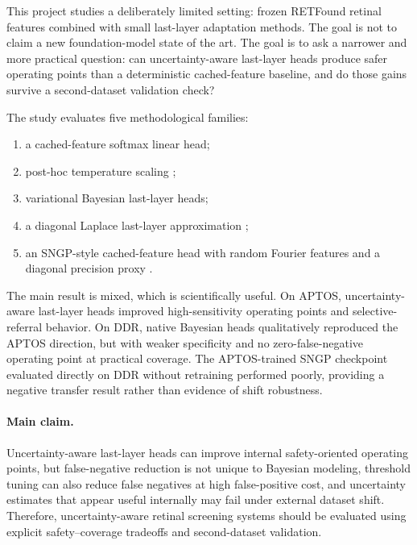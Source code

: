 \documentclass[11pt]{article}
\begin{document}
This project studies a deliberately limited setting: frozen RETFound retinal features \citep{zhou2023retfound} combined with small last-layer adaptation methods. The goal is not to claim a new foundation-model state of the art. The goal is to ask a narrower and more practical question: can uncertainty-aware last-layer heads produce safer operating points than a deterministic cached-feature baseline, and do those gains survive a second-dataset validation check?

The study evaluates five methodological families:
\begin{enumerate}[leftmargin=1.2em]
\item a cached-feature softmax linear head;
\item post-hoc temperature scaling \citep{guo2017calibration};
\item variational Bayesian last-layer heads;
\item a diagonal Laplace last-layer approximation \citep{ritter2018scalable,daxberger2021laplace};
\item an SNGP-style cached-feature head with random Fourier features and a diagonal precision proxy \citep{liu2020simple}.
\end{enumerate}

The main result is mixed, which is scientifically useful. On APTOS, uncertainty-aware last-layer heads improved high-sensitivity operating points and selective-referral behavior. On DDR, native Bayesian heads qualitatively reproduced the APTOS direction, but with weaker specificity and no zero-false-negative operating point at practical coverage. The APTOS-trained SNGP checkpoint evaluated directly on DDR without retraining performed poorly, providing a negative transfer result rather than evidence of shift robustness.

\paragraph{Main claim.}
Uncertainty-aware last-layer heads can improve internal safety-oriented operating points, but false-negative reduction is not unique to Bayesian modeling, threshold tuning can also reduce false negatives at high false-positive cost, and uncertainty estimates that appear useful internally may fail under external dataset shift. Therefore, uncertainty-aware retinal screening systems should be evaluated using explicit safety--coverage tradeoffs and second-dataset validation.
\end{document}
